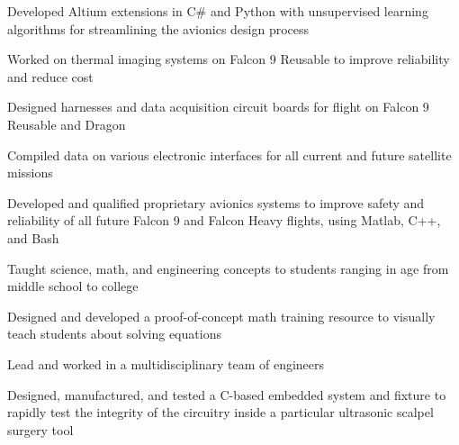 \documentclass[letterpaper]{article}
\begin{document}
\begin{compactitem}
	\item Developed Altium extensions in C\# and Python with unsupervised learning algorithms for streamlining the avionics design process\\
	\item Worked on thermal imaging systems on Falcon 9 Reusable to improve reliability and reduce cost\\
	\item Designed harnesses and data acquisition circuit boards for flight on Falcon 9 Reusable and Dragon\\
	\item Compiled data on various electronic interfaces for all current and future satellite missions\\
	\item Developed and qualified proprietary avionics systems to improve safety and reliability of all future Falcon 9 and Falcon Heavy flights, using Matlab, C++, and Bash
\end{compactitem}

\begin{compactitem}
	\item Taught science, math, and engineering concepts to students ranging in age from middle school to college\\
	\item Designed and developed a proof-of-concept math training resource to visually teach students about solving equations
\end{compactitem}

\begin{compactitem}
	\item Lead and worked in a multidisciplinary team of engineers\\
	\item Designed, manufactured, and tested a C-based embedded system and fixture to rapidly test the integrity of the circuitry inside a particular ultrasonic scalpel surgery tool
\end{compactitem}
\end{document}
